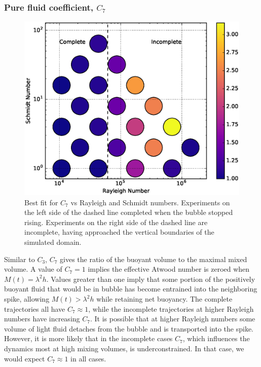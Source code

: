 \subsubsection{Pure fluid coefficient, $C_7$}
\begin{figure}
\includegraphics[width=\columnwidth]{figs/C7-vs-Rayleigh-Schmidt}
\caption{ 
  Best fit for $C_7$ vs Rayleigh and Schmidt numbers.
  Experiments on the left side of the dashed line completed when the bubble stopped rising.
  Experiments on the right side of the dashed line are incomplete, having approached the vertical boundaries of the simulated domain.
}
\end{figure}

Similar to $C_3$, $C_7$ gives the ratio of the buoyant volume to the maximal mixed volume.
A value of $C_7 = 1$ implies the effective Atwood number is zeroed when $M(t) = \lambda^2 h$.
Values greater than one imply that some portion of the positively buoyant fluid that would be in bubble has become entrained into the neighboring spike, allowing $M(t) > \lambda^2 h$ while retaining net buoyancy.
The complete trajectories all have $C_7 \approx 1$, while the incomplete trajectories at higher Rayleigh numbers have increasing $C_7$.
It is possible that at higher Rayleigh numbers some volume of light fluid detaches from the bubble and is transported into the spike.
However, it is more likely that in the incomplete cases $C_7$, which influences the dynamics most at high mixing volumes, is underconstrained.
In that case, we would expect $C_7 \approx 1$ in all cases. 

